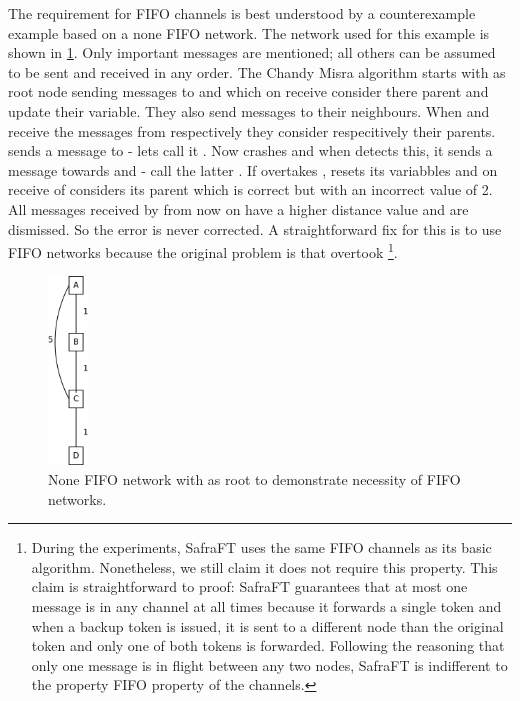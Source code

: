The requirement for FIFO channels is best understood by a counterexample example based on a none FIFO network.
The network used for this example is shown in \cref{fig:fifoNecessaryNetwork}.
Only important messages are mentioned; all others can be assumed to be sent and received in any order.
The Chandy Misra algorithm starts with  as root node sending  messages to  and  which on receive consider  there parent and update their  variable.
They also send  messages to their neighbours.
When  and  receive the  messages from  respectively  they consider  respecitively  their parents.
 sends a  message to  - lets call it .
Now  crashes and when  detects this, it sends a  message towards  and  - call the latter .
If  overtakes ,  resets its variabbles and on receive of  considers  its parent which is correct but with an incorrect  value of 2.
All  messages received by  from now on have a higher distance value and are dismissed.
So the error is never corrected.
A straightforward fix for this is to use FIFO networks because the original problem is that  overtook \footnote{During the experiments, SafraFT uses the same FIFO channels as its basic algorithm.
Nonetheless, we still claim it does not require this property.
This claim is straightforward to proof: SafraFT guarantees that at most one message is in any channel at all times because it forwards a single token and when a backup token is issued, it is sent to a different node than the original token and only one of both tokens is forwarded.
Following the reasoning that only one message is in flight between any two nodes, SafraFT is indifferent to the property FIFO property of the channels.}.

\begin{figure}[h]
    \includegraphics[height=5cm]{figures/FIFO_necessary}
    \centering
    \caption{None FIFO network with  as root to demonstrate necessity of FIFO networks.}
    \label{fig:fifoNecessaryNetwork}
\end{figure}

